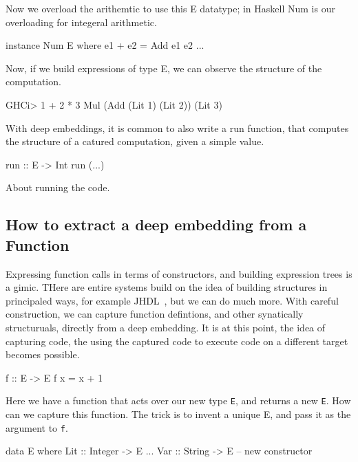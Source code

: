 \documentclass[11pt]{article}
\begin{document}
Now we overload the arithemtic to use this E datatype;
in Haskell Num is our overloading for integeral arithmetic.

\begin{Code}
instance Num E where
  e1 + e2 = Add e1 e2
  ...
  
\end{Code}

Now, if we build expressions of type E, we can
observe the structure of the computation.
\begin{SemiCode}
GHCi> 1 + 2 * 3
Mul (Add (Lit 1) (Lit 2)) (Lit 3)
\end{SemiCode}

With deep embeddings, it is common to also
write a run function, that computes the structure
of a catured computation, given a simple value.
\begin{Code}
run :: E -> Int
run (...)
\end{Code}

About running the code.

\subsection{How to extract a deep embedding from a Function}

Expressing function calls in terms of constructors,  and
building expression trees is a gimic. THere are entire
systems build on the idea of building structures 
in principaled ways, for example JHDL~\cite{..}, but
we can do much more. With careful construction,
we can capture function defintions,
and other synatically structuruals,
directly from a deep embedding. It is at this
point, the idea of capturing code,
the using the captured code to execute code
on a different target becomes possible.

\begin{Code}

f :: E -> E
f x = x + 1
        
\end{Code}

Here we have a function that acts over our new type
\verb|E|, and returns a new \verb|E|. How can we capture
this function.
The trick is to invent a unique E, and pass it as the argument
to \verb|f|.

\begin{Code}
data E where
  Lit :: Integer -> E
  ...
  Var :: String -> E    -- new constructor
\end{Code}        
\end{document}
